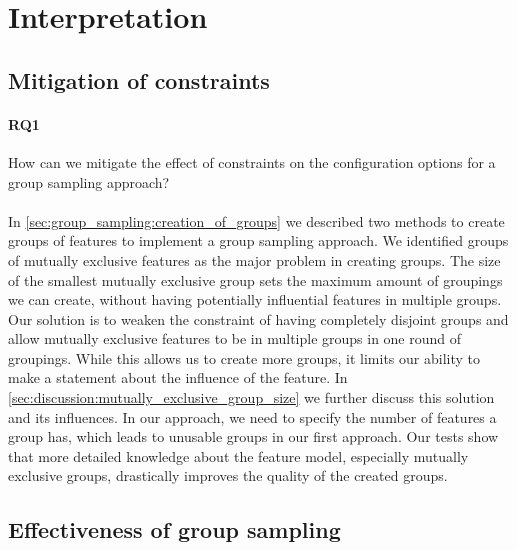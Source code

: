 \documentclass[../thesis.tex]{subfiles}
\begin{document}







\section{Interpretation}\label{sec:evaluation:interpretation}


\subsection{Mitigation of constraints}
\paragraph{RQ1} How can we mitigate the effect of constraints on the configuration options for a group sampling approach?
\paragraph{}
In \autoref{sec:group_sampling:creation_of_groups} we described two methods to create groups of features to
implement a group sampling approach. We identified groups of mutually exclusive features as the major problem
in creating groups. The size of the smallest mutually exclusive group sets the maximum amount of groupings we
can create, without having potentially influential features in multiple groups.
Our solution is to weaken the constraint of having completely disjoint groups and allow mutually
exclusive features to be in multiple groups in one round of groupings.
While this allows us to create more groups, it limits our ability to make a statement about the influence of the feature.
In \autoref{sec:discussion:mutually_exclusive_group_size} we further discuss this solution and its influences.
In our approach, we need to specify the number of features a group has, which leads to unusable groups in our first approach.
Our tests show that more detailed knowledge about the feature model, especially mutually exclusive groups,
drastically improves the quality of the created groups.



\subsection{Effectiveness of group sampling}
\end{document}
